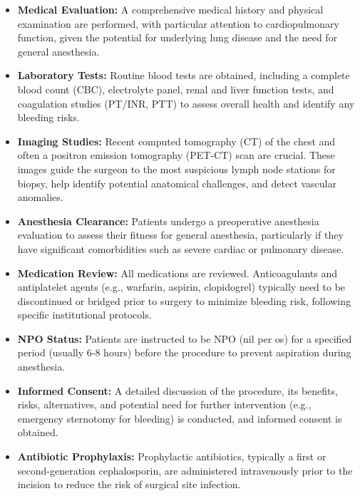 \begin{itemize}
  \item \textbf{Medical Evaluation:} A comprehensive medical history and physical examination are performed, with particular attention to cardiopulmonary function, given the potential for underlying lung disease and the need for general anesthesia.
  \item \textbf{Laboratory Tests:} Routine blood tests are obtained, including a complete blood count (CBC), electrolyte panel, renal and liver function tests, and coagulation studies (PT/INR, PTT) to assess overall health and identify any bleeding risks.
  \item \textbf{Imaging Studies:} Recent computed tomography (CT) of the chest and often a positron emission tomography (PET-CT) scan are crucial. These images guide the surgeon to the most suspicious lymph node stations for biopsy, help identify potential anatomical challenges, and detect vascular anomalies.
  \item \textbf{Anesthesia Clearance:} Patients undergo a preoperative anesthesia evaluation to assess their fitness for general anesthesia, particularly if they have significant comorbidities such as severe cardiac or pulmonary disease.
  \item \textbf{Medication Review:} All medications are reviewed. Anticoagulants and antiplatelet agents (e.g., warfarin, aspirin, clopidogrel) typically need to be discontinued or bridged prior to surgery to minimize bleeding risk, following specific institutional protocols.
  \item \textbf{NPO Status:} Patients are instructed to be NPO (nil per os) for a specified period (usually 6-8 hours) before the procedure to prevent aspiration during anesthesia.
  \item \textbf{Informed Consent:} A detailed discussion of the procedure, its benefits, risks, alternatives, and potential need for further intervention (e.g., emergency sternotomy for bleeding) is conducted, and informed consent is obtained.
  \item \textbf{Antibiotic Prophylaxis:} Prophylactic antibiotics, typically a first or second-generation cephalosporin, are administered intravenously prior to the incision to reduce the risk of surgical site infection.
\end{itemize}

